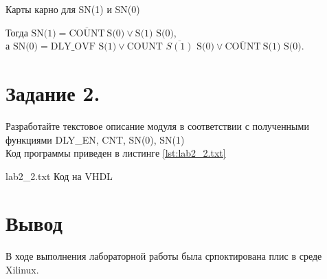 \documentclass{bmstu}
\begin{document}
\begin{table}[ht]
\begin{center}
	\caption{Карты карно для SN(1) и SN(0)}
	
	\begin{karnaugh-map}
	\end{karnaugh-map}
	\quad
	\begin{karnaugh-map}
	\end{karnaugh-map}
\end{center}
\end{table}
\newpage
Тогда $\text{SN(1)} = \overline{\text{COUNT}} ~ \text{S(0)} \vee \text{S(1) S(0)} $,  \\
а  $\text{SN(0)} = \text{DLY\_OVF S(1)} \vee \text{COUNT $\overline{S(1)}$ S(0)} \vee \overline{\text{COUNT}}~ \text{S(1) S(0)}$. 

\newpage
\section*{Задание 2. }
Разработайте текстовое описание модуля в соответствии с полученными
функциями DLY\_EN, CNT, SN(0), SN(1)\\
Код программы приведен в листинге \ref{lst:lab2_2.txt}

	{lab2_2.txt}
	{Код на VHDL}


\section*{Вывод}
В ходе выполнения лабораторной работы была српоктирована плис в среде Xilinux.
\end{document}
